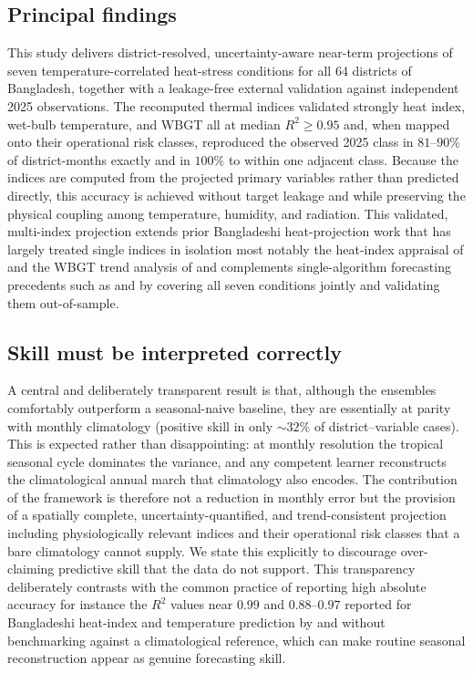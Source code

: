 \documentclass[review,11pt]{elsarticle}
\begin{document}
\subsection{Principal findings}
This study delivers district-resolved, uncertainty-aware near-term projections of
seven temperature-correlated heat-stress conditions for all 64 districts of
Bangladesh, together with a leakage-free external validation against independent
2025 observations. The recomputed thermal indices validated strongly heat
index, wet-bulb temperature, and WBGT all at median $R^{2}\ge0.95$ and, when
mapped onto their operational risk classes, reproduced the observed 2025 class in
$81$--$90\%$ of district-months exactly and in $100\%$ to within one adjacent
class. Because the indices are computed from the projected primary variables
rather than predicted directly, this accuracy is achieved without target leakage
and while preserving the physical coupling among temperature, humidity, and
radiation. This validated, multi-index projection extends prior Bangladeshi
heat-projection work that has largely treated single indices in isolation most
notably the heat-index appraisal of \citet{rahman2021} and the WBGT trend analysis
of \citet{kamal2024scientific} and complements single-algorithm forecasting
precedents such as \citet{mollah2026mlheatindex} and \citet{islam2026enso} by
covering all seven conditions jointly and validating them out-of-sample.

\subsection{Skill must be interpreted correctly}
A central and deliberately transparent result is that, although the ensembles
comfortably outperform a seasonal-naive baseline, they are essentially at parity
with monthly climatology (positive skill in only $\sim\!32\%$ of
district--variable cases). This is expected rather than disappointing: at monthly
resolution the tropical seasonal cycle dominates the variance, and any competent
learner reconstructs the climatological annual march that climatology also
encodes. The contribution of the framework is therefore not a reduction in
monthly error but the provision of a spatially complete, uncertainty-quantified,
and trend-consistent projection including physiologically relevant indices and
their operational risk classes that a bare climatology cannot supply. We state
this explicitly to discourage over-claiming predictive skill that the data do not
support. This transparency deliberately contrasts with the common practice of
reporting high absolute accuracy for instance the $R^{2}$ values near $0.99$ and
$0.88$--$0.97$ reported for Bangladeshi heat-index and temperature prediction by
\citet{mollah2026mlheatindex} and \citet{islam2026enso} without benchmarking
against a climatological reference, which can make routine seasonal reconstruction
appear as genuine forecasting skill.
\end{document}
